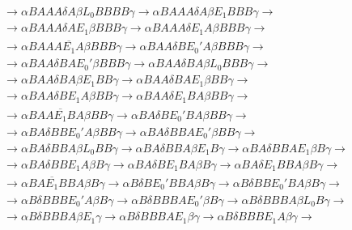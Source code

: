 \begin{ejercicio}
\begin{enumerate}
\begin{description}
\begin{align*}
                      &\rightarrow \alpha BAAA \delta A\beta L_0 BBBB \gamma \rightarrow \alpha BAAA \delta A\beta E_1 BBB \gamma \rightarrow \\
                      &\rightarrow \alpha BAAA \delta A E_1\beta BBB \gamma \rightarrow \alpha BAAA\delta E_1 A \beta BBB \gamma \rightarrow \\
                      &\rightarrow \alpha B AAA \overline{E_1} A \beta BBB \gamma \rightarrow \alpha BAA \delta B E_0' A \beta BBB \gamma \rightarrow \\ 
                      &\rightarrow \alpha BAA \delta BA E_0' \beta BBB \gamma \rightarrow \alpha BAA \delta BA \beta L_0 BBB \gamma \rightarrow \\
                      &\rightarrow \alpha BAA \delta BA \beta E_1 BB \gamma \rightarrow \alpha BAA \delta BA E_1 \beta BB \gamma \rightarrow \\
                      &\rightarrow \alpha BAA \delta BE_1 A \beta BB \gamma \rightarrow \alpha BAA \delta E_1 BA \beta BB \gamma \rightarrow \\
                      &\rightarrow \alpha BAA \overline{E_1} BA \beta BB \gamma \rightarrow \alpha BA \delta B E_0' BA \beta BB \gamma \rightarrow \\
                      &\rightarrow \alpha BA \delta BBE_0' A \beta BB \gamma \rightarrow \alpha BA \delta BBA E_0' \beta BB \gamma \rightarrow \\
                      &\rightarrow \alpha BA \delta BBA \beta L_0 BB \gamma \rightarrow \alpha BA \delta BBA \beta E_1 B \gamma \rightarrow \alpha BA \delta BBA E_1 \beta B\gamma \rightarrow \\
                      &\rightarrow \alpha BA \delta BBE_1 A \beta B \gamma \rightarrow \alpha BA \delta B E_1 BA \beta B \gamma \rightarrow \alpha BA \delta E_1 BBA \beta B \gamma \rightarrow \\
                      &\rightarrow \alpha BA \overline{E_1} BBA \beta B \gamma \rightarrow \alpha B \delta B E_0' BBA \beta B \gamma \rightarrow \alpha B\delta BB E_0' BA \beta B \gamma \rightarrow \\
                      &\rightarrow \alpha B\delta BBB E_0' A \beta B \gamma \rightarrow \alpha B\delta BBBA E_0' \beta B \gamma \rightarrow \alpha B \delta BBBA \beta L_0 B \gamma \rightarrow \\
                      &\rightarrow \alpha B \delta BBBA \beta E_1 \gamma \rightarrow \alpha B \delta BBBA E_1 \beta \gamma \rightarrow \alpha B \delta BBB E_1 A \beta \gamma \rightarrow \\

\end{align*}
\end{description}
\end{enumerate}
\end{ejercicio}
